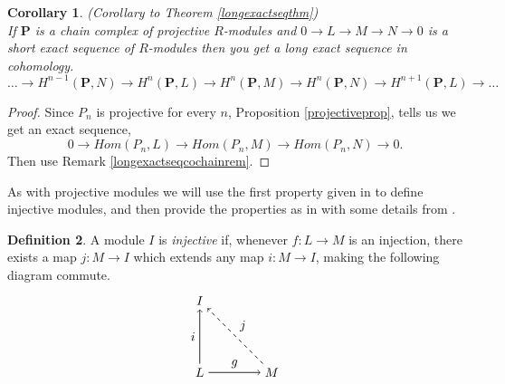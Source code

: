 \documentclass[11.5pt, twoside, a4paper, titlepage]{report}
\theoremstyle{definition}
\newtheorem{mydef}{Definition}[section]
\theoremstyle{plain}
\newtheorem{cor}[mydef]{Corollary}
\begin{document}
\begin{cor} (Corollary to Theorem \ref{longexactseqthm})\\
If $\mathbf{P}$ is a chain complex of projective $R$-modules and $0\xrightarrow{}L\xrightarrow{}M\xrightarrow{}N\xrightarrow{}0$ is a short exact sequence of $R$-modules then you get a long exact sequence in cohomology.
\begin{equation*}
\dots \xrightarrow{} H^{n-1}(\mathbf{P}, N) \xrightarrow{} H^n(\mathbf{P}, L) \xrightarrow{} H^n(\mathbf{P}, M) \xrightarrow{} H^n(\mathbf{P}, N) \xrightarrow{} H^{n+1}(\mathbf{P}, L) \xrightarrow{} \dots
\end{equation*}
\end{cor}
\begin{proof}
Since $P_n$ is projective for every $n$, Proposition \ref{projectiveprop}, tells us we get an exact sequence,
\begin{equation*}
0\xrightarrow{} Hom(P_n, L) \xrightarrow{} Hom(P_n, M) \xrightarrow{} Hom(P_n, N) \xrightarrow{} 0.
\end{equation*}
Then use Remark \ref{longexactseqcochainrem}.
\end{proof}

As with projective modules we will use the first property given in \cite{CB1} to define injective modules, and then provide the properties as in \cite{CB1} with some details from \cite{Rotman}.

\begin{mydef}
A module $I$ is \emph{injective} if, whenever $f: L \to M$ is an injection, there exists a map $j: M \to I$ which extends any map $i: M \to I$, making the following diagram commute.
\begin{equation*}
\begin{tikzpicture}[->,-latex, auto, main path/.style={->, semithick}, main node/.style={}]
\node	[main node]		(1) at (0,0)		{$L$};
\node	[main node]		(2) at (2,0)		{$M$};
\node [main node]		(3) at (0,2)		{$I$};

\draw (1) edge [main path] node [auto] {$g$} (2);
\draw (1) edge [main path] node [auto] {$i$} (3);
\draw (2) edge [dashed, ->, semithick] node [auto, swap] {$j$} (3);
\end{tikzpicture}
\end{equation*}
\end{mydef}
\end{document}

